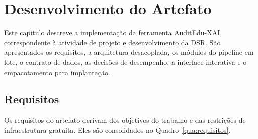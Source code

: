 \chapter{Desenvolvimento do Artefato}
\label{cap:desenvolvimento}

Este capítulo descreve a implementação da ferramenta AuditEdu-XAI, correspondente à atividade de projeto e desenvolvimento da DSR. São apresentados os requisitos, a arquitetura desacoplada, os módulos do pipeline em lote, o contrato de dados, as decisões de desempenho, a interface interativa e o empacotamento para implantação.

\section{Requisitos}
\label{sec:requisitos}

Os requisitos do artefato derivam dos objetivos do trabalho e das restrições de infraestrutura gratuita. Eles são consolidados no Quadro~\ref{qua:requisitos}.

